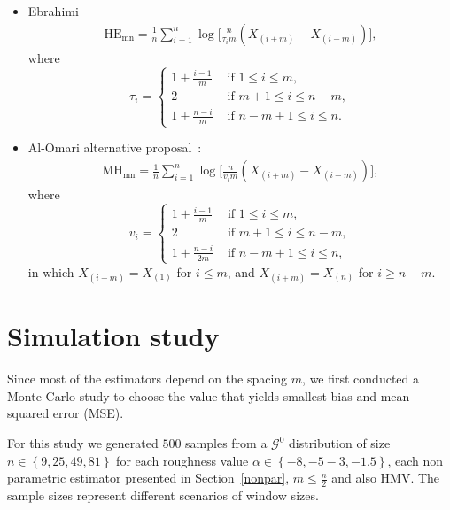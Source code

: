 \documentclass[journal]{IEEEtran}
\begin{document}
\begin{itemize}
	\item Ebrahimi~\cite{Ebrahimi94}
	\begin{align}
	\text{HE}_\text{{mn}}=\frac{1}{n} \sum_{i=1}^{n} \log \Big[\frac{n}{\tau_{i} m}\left(X_{(i+m)}-X_{(i-m)}\right)\Big],
		\label{HE}
	\end{align}
	where
	\begin{equation*}
	\tau_{i}=\begin{cases}
		1+\frac{i-1}{m} & \text{ if }1 \leq i \leq m, \\
		2 & \text{ if } m+1 \leq i \leq n-m, \\
		1+\frac{n-i}{m} & \text{ if } n-m+1 \leq i \leq n.
			\end{cases}
	\end{equation*}
	\item Al-Omari alternative proposal~\cite{AlOmari2016}:
	\label{MH}
	\begin{align}
	\text{MH}_\text{{mn}}=\frac{1}{n} \sum_{i=1}^{n} \log \Big[\frac{n}{v_{i} m}\left(X_{(i+m)}-X_{(i-m)}\right)\Big],
	\end{align}
where
	\begin{equation*}
	v_{i}=\begin{cases}
	1+\frac{i-1}{m} & \text{ if }1 \leq i \leq m, \\
	2 & \text{ if } m+1 \leq i \leq n-m, \\
	1+\frac{n-i}{2 m} & \text{ if } n-m+1 \leq i \leq n,
		\end{cases}
	\end{equation*}
in which $X_{(i-m)}=X_{(1)}$ for $i \leq m$, and $X_{(i+m)}=X_{(n)}$ for $i \geq n-m$.
\end{itemize}

\section{Simulation study}\label{simulation}

Since most of the estimators depend on the spacing $m$, we first conducted a Monte Carlo study  to choose the value that yields smallest bias and mean squared error (MSE). %

For this study we generated $500$ samples from a $\mathcal{G}^0$ distribution of size $n \in\left\lbrace 9,25,49,81\right\rbrace $ for each roughness value $\alpha \in\left\lbrace -8,-5-3,-1.5\right\rbrace $, each non parametric estimator presented in Section~\ref{nonpar}, $m \leq \frac{n}{2}$ and also HMV. 
The sample sizes represent different scenarios of window sizes. 
\end{document}
